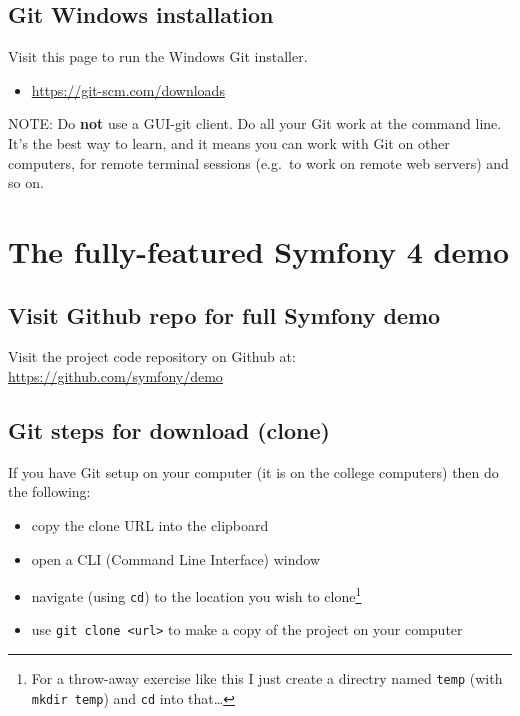 \documentclass[a4paperpaper,openright]{book}
\providecommand{\tightlist}{%
  \setlength{\itemsep}{0pt}\setlength{\parskip}{0pt}}
\begin{document}
\hypertarget{git-windows-installation}{%
\section{Git Windows installation}\label{git-windows-installation}}

Visit this page to run the Windows Git installer.

\begin{itemize}
\tightlist
\item
  \url{https://git-scm.com/downloads}
\end{itemize}

NOTE: Do \textbf{not} use a GUI-git client. Do all your Git work at the
command line. It's the best way to learn, and it means you can work with
Git on other computers, for remote terminal sessions (e.g.~to work on
remote web servers) and so on.

\hypertarget{the-fully-featured-symfony-4-demo}{%
\chapter{\texorpdfstring{The fully-featured Symfony 4
demo\label{appendix_sf_demo}}{The fully-featured Symfony 4 demo}}\label{the-fully-featured-symfony-4-demo}}

\hypertarget{visit-github-repo-for-full-symfony-demo}{%
\section{Visit Github repo for full Symfony
demo}\label{visit-github-repo-for-full-symfony-demo}}

Visit the project code repository on Github at:
\url{https://github.com/symfony/demo}

\hypertarget{git-steps-for-download-clone}{%
\section{Git steps for download
(clone)}\label{git-steps-for-download-clone}}

If you have Git setup on your computer (it is on the college computers)
then do the following:

\begin{itemize}
\item
  copy the clone URL into the clipboard
\item
  open a CLI (Command Line Interface) window
\item
  navigate (using \texttt{cd}) to the location you wish to
  clone\footnote{For a throw-away exercise like this I just create a
    directry named \texttt{temp} (with \texttt{mkdir\ temp}) and
    \texttt{cd} into that\ldots{}}
\item
  use \texttt{git\ clone\ \textless{}url\textgreater{}} to make a copy
  of the project on your computer
\end{itemize}
\end{document}
